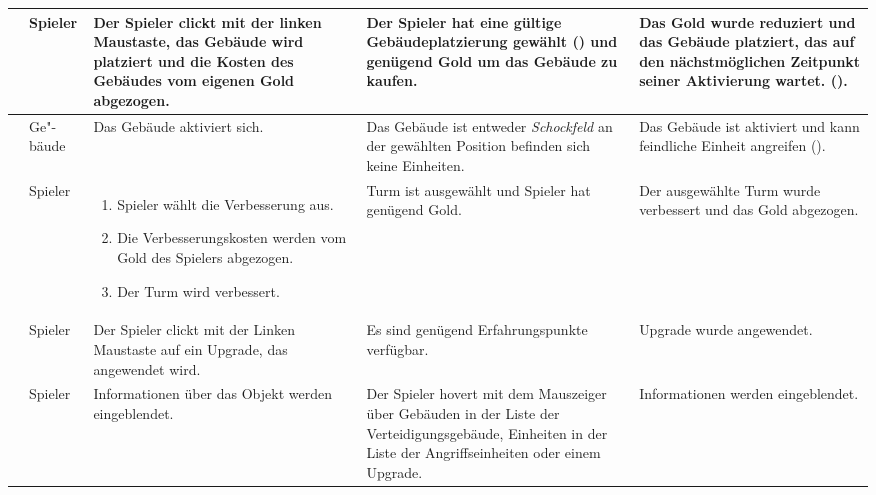 \begin{longtabu}{X[0.6L]X[0.4L]X[L]X[L]X[L]}
    & Spieler
    & Der Spieler clickt mit der linken Maustaste, das Gebäude wird platziert
      und die Kosten des Gebäudes vom eigenen Gold abgezogen.
    & Der Spieler hat eine gültige Gebäudeplatzierung gewählt
      () und genügend Gold um das Gebäude zu kaufen.
    & Das Gold wurde reduziert und das Gebäude platziert, das auf den
      nächstmöglichen Zeitpunkt seiner Aktivierung wartet.
      ().
    \\\midrule

    & Ge"-bäude
    & Das Gebäude aktiviert sich.
    & Das Gebäude ist entweder \emph{Schockfeld} \textbf{} an der
      gewählten Position befinden sich keine Einheiten.
    & Das Gebäude ist aktiviert und kann feindliche Einheit angreifen
      ().
  \\\midrule

    & Spieler
    & \vspace*{-0.2cm}\begin{enumerate}[nosep, leftmargin=*]
        \item Spieler wählt die Verbesserung aus.
        \item Die Verbesserungskosten werden vom Gold des Spielers abgezogen.
        \item Der Turm wird verbessert.
      \end{enumerate}
    & Turm ist ausgewählt und Spieler hat genügend Gold.
    & Der ausgewählte Turm wurde verbessert und das Gold abgezogen.
  \\\midrule

    & Spieler
    & Der Spieler clickt mit der Linken Maustaste auf ein Upgrade, das
      angewendet wird.
    & Es sind genügend Erfahrungspunkte verfügbar.
    & Upgrade wurde angewendet.
  \\\midrule

    & Spieler
    & Informationen über das Objekt werden eingeblendet.
    & Der Spieler hovert mit dem Mauszeiger über Gebäuden in der Liste der
      Verteidigungsgebäude, Einheiten in der Liste der Angriffseinheiten oder
      einem Upgrade.
    & Informationen werden eingeblendet.

  \\\bottomrule
\end{longtabu}
\endgroup
